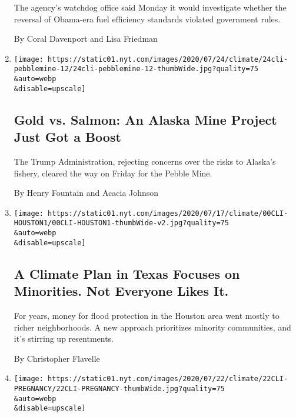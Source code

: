 \begin{enumerate}
  The agency's watchdog office said Monday it would investigate whether
  the reversal of Obama-era fuel efficiency standards violated
  government rules.

  By Coral Davenport and Lisa Friedman
\item
  \href{/2020/07/24/climate/pebble-mine-alaska-environment.html}{}

  \texttt{[image: https://static01.nyt.com/images/2020/07/24/climate/24cli-pebblemine-12/24cli-pebblemine-12-thumbWide.jpg?quality=75\\\&auto=webp\\\&disable=upscale]}

  \hypertarget{gold-vs-salmon-an-alaska-mine-project-just-got-a-boost}{%
  \subsection{Gold vs. Salmon: An Alaska Mine Project Just Got a
  Boost}\label{gold-vs-salmon-an-alaska-mine-project-just-got-a-boost}}

  The Trump Administration, rejecting concerns over the risks to
  Alaska's fishery, cleared the way on Friday for the Pebble Mine.

  By Henry Fountain and Acacia Johnson
\item
  \href{/2020/07/24/climate/houston-flooding-race.html}{}

  \texttt{[image: https://static01.nyt.com/images/2020/07/17/climate/00CLI-HOUSTON1/00CLI-HOUSTON1-thumbWide-v2.jpg?quality=75\\\&auto=webp\\\&disable=upscale]}

  \hypertarget{a-climate-plan-in-texas-focuses-on-minorities-not-everyone-likes-it}{%
  \subsection{A Climate Plan in Texas Focuses on Minorities. Not
  Everyone Likes
  It.}\label{a-climate-plan-in-texas-focuses-on-minorities-not-everyone-likes-it}}

  For years, money for flood protection in the Houston area went mostly
  to richer neighborhoods. A new approach prioritizes minority
  communities, and it's stirring up resentments.

  By Christopher Flavelle
\item
  \href{/2020/07/22/climate/gas-flares-premature-babies.html}{}

  \texttt{[image: https://static01.nyt.com/images/2020/07/22/climate/22CLI-PREGNANCY/22CLI-PREGNANCY-thumbWide.jpg?quality=75\\\&auto=webp\\\&disable=upscale]}


\end{enumerate}
